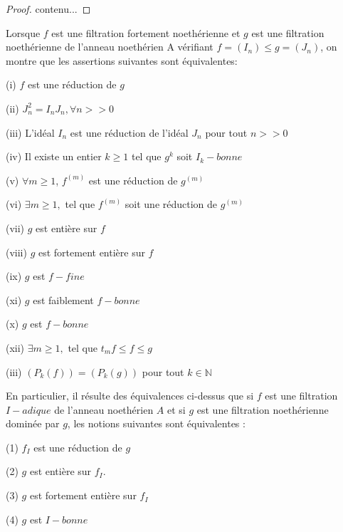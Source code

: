 \begin{proof}
	contenu...
\end{proof}
\begin{maproposition}
	Lorsque $f$ est une filtration fortement noethérienne et $g$ est une
	filtration noethérienne de l'anneau noethérien A vérifiant $
	f=(I_{n})\leq g=(J_{n})$, on montre que les assertions suivantes sont équivalentes:
	
	(i) $f$ est une réduction de $g$
	
	(ii) $J_{n}^{2}=I_{n}J_{n},\forall n>>0$
	
	(iii) L'idéal $I_{n}$ est une réduction de l'idéal $J_{n}$ pour
	tout $n>>0$
	
	(iv) Il existe un entier $k\geq 1$ tel que $g^{k}$ soit $I_{k}-bonne$
	
	(v) $\forall m\geq 1$, $f^{(m)}$ est une réduction de $g^{(m)}$
	
	(vi) $\exists m\geq 1,$ tel que $f^{(m)}$ soit une réduction de $g^{(m)}$
	
	(vii) $g$ est entière sur $f$
	
	(viii) $g$ est fortement entière sur $f$
	
	(ix) $g$ est $f-fine$
	
	(xi) $g$ est faiblement $f-bonne$
	
	(x) $g$ est $f-bonne$
	
	(xii) $\exists m\geq 1,$ tel que $t_{m}f\leq f\leq g$
	
	(iii) $(P_{k}(f))=(P_{k}(g))$ pour tout $k\in\mathbb{N}$
	
	En particulier, il résulte des équivalences ci-dessus que si $f$ est une filtration $I-adique$ de l'anneau noethérien $A$ et si $g$ est
	une filtration noethérienne dominée par $g$, les notions suivantes
	sont équivalentes :
	
	(1) $f_{I}$ est une réduction de $g$
	
	(2) $g$ est entière sur $f_{I}$.
	
	(3) $g$ est fortement entière sur $f_{I}$
	
	(4) $g$ est $I-bonne$
	
\end{maproposition}

